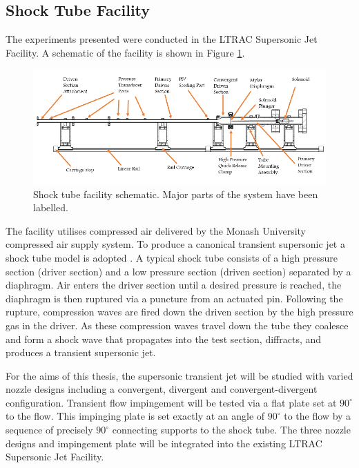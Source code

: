 \subsection{Shock Tube Facility}
The experiments presented were conducted in the LTRAC Supersonic Jet Facility. A schematic of the facility is shown in Figure \ref{fig:shocktube}. 

\begin{figure}[H] 
	\centering
	\includegraphics[width=1\textwidth]{fig9.PNG} 
	\caption{Shock tube facility schematic. Major parts of the
		system have been labelled.}
	\label{fig:shocktube}
\end{figure}	

The facility utilises compressed air delivered by the Monash University compressed air supply system. To produce a canonical transient supersonic jet a shock tube model is adopted \cite{john1962shock}. A typical shock tube consists of a high pressure section (driver section) and a low pressure section (driven section) separated by a diaphragm. Air enters the driver section until a desired pressure is reached, the diaphragm is then ruptured via a puncture from an actuated pin. Following the rupture, compression waves are fired down the driven section by the high pressure gas in the driver. As these compression waves travel down the tube they coalesce and form a shock wave that propagates into the test section, diffracts, and produces a transient supersonic jet. 

For the aims of this thesis, the supersonic transient jet will be studied with varied nozzle designs including a convergent, divergent and convergent-divergent configuration. Transient flow impingement will be tested via a flat plate set at $90^\circ$ to the flow. This impinging plate is set exactly at an angle of $90^\circ$ to the flow by a sequence of precisely $90^\circ$ connecting supports to the shock tube. The three nozzle designs and impingement plate will be integrated into the existing LTRAC Supersonic Jet Facility.

